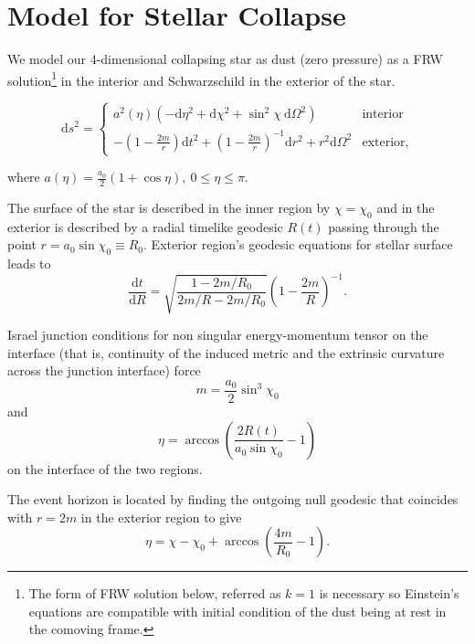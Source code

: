 \documentclass[reprint,amsmath,amssymb,aps,nofootinbib]{revtex4-1}
\newcommand{\ud}{\mathrm{d}}
\begin{document}
\section{Model for Stellar Collapse}
We model our 4-dimensional collapsing star as dust (zero pressure) as a FRW solution\footnote{The form of FRW solution below, referred as $k=1$ is necessary so Einstein's equations are compatible with initial condition of the dust being at rest in the comoving frame.} in the interior and Schwarzschild in the exterior of the star.
\begin{widetext}
\begin{equation}
 \ud s^2=
 \begin{cases}
  a^2(\eta)(-\ud\eta^2+\ud\chi^2+\sin^2\chi\ \ud\Omega^2) & \text{interior}\\
  -\left(1-\frac{2m}{r}\right)\ud t^2+\left(1-\frac{2m}{r}\right)^{-1}\ud r^2+r^2\ud\Omega^2 & \text{exterior},
  \end{cases}
 \label{metric}
\end{equation}
\end{widetext}
where $a(\eta)=\frac{a_0}{2}(1+\cos\eta),\ 0\leq\eta\leq\pi$.

The surface of the star is described in the inner region by $\chi=\chi_0$ and in the exterior is described by a radial timelike geodesic $R(t)$ passing through the point $r=a_0\sin\chi_0\equiv R_0$. Exterior region's geodesic equations for stellar surface leads to
\begin{equation}
 \frac{\ud t}{\ud R}=\sqrt{\frac{1-2m/R_0}{2m/R-2m/R_0}}\left(1-\frac{2m}{R}\right)^{-1}.
 \label{SSurface}
\end{equation}

Israel junction conditions for non singular energy-momentum tensor on the interface (that is, continuity of the induced metric and the extrinsic curvature across the junction interface) force \cite{George, rc1}
\begin{equation}
 m=\frac{a_0}{2}\sin^3\chi_0
 \label{junction1}
\end{equation}
and
\begin{equation}
 \eta=\arccos\left(\frac{2R(t)}{a_0\sin\chi_0}-1\right)
 \label{junction2}
\end{equation}
 on the interface of the two regions.

The event horizon is located by finding the outgoing null geodesic that coincides with $r=2m$ in the exterior region to give 
\begin{equation}
 \eta=\chi-\chi_0+\arccos\left(\frac{4m}{R_0}-1\right).
\label{eventhorizon}
\end{equation}
\end{document}
